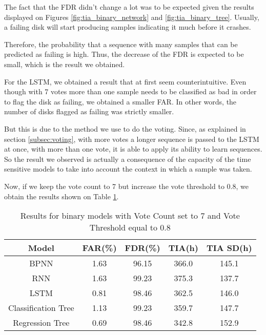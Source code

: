 The fact that the FDR didn't change a lot was to be expected given the results displayed on Figures \ref{fig:tia_binary_network} and \ref{fig:tia_binary_tree}.
Usually, a failing disk will start producing samples indicating it much before it crashes.

Therefore, the probability that a sequence with many samples that can be predicted as failing is high.
Thus, the decrease of the FDR is expected to be small, which is the result we obtained.

For the LSTM, we obtained a result that at first seem counterintuitive.
Even though with 7 votes more than one sample needs to be classified as bad in order to flag the disk as failing, we obtained a smaller FAR.
In other words, the number of disks flagged as failing was strictly smaller.

But this is due to the method we use to do the voting.
Since, as explained in section \ref{subsec:voting}, with more votes a longer sequence is passed to the LSTM at once, with more than one vote, it is able to apply its ability to learn sequences.
So the result we observed is actually a consequence of the capacity of the time sensitive models to take into account the context in which a sample was taken.

Now, if we keep the vote count to 7 but increase the vote threshold to 0.8, we obtain the results shown on Table \ref{table:results_binary_threshold}.

\begin{table}
  \begin{center}
    \begin{tabular}{|c|c|c|c|c|}
      \hline
    Model & FAR(\%) & FDR(\%) & TIA(h) & TIA SD(h) \\
    \hline
    BPNN & 1.63 & 96.15 & 366.0 & 145.1 \\
    RNN & 1.63 & 99.23 & 375.3 & 137.7 \\
    LSTM & 0.81 & 98.46 & 362.5 & 146.0 \\
    Classification Tree & 1.13 & 99.23 & 359.7 & 147.7 \\
    Regression Tree & 0.69 & 98.46 & 342.8 & 152.9 \\
    \hline
    \end{tabular}
    \caption[Results Binary Models with Threshold]{Results for binary models with Vote Count set to 7 and Vote Threshold equal to 0.8}
    \label{table:results_binary_threshold}
  \end{center}
\end{table}

